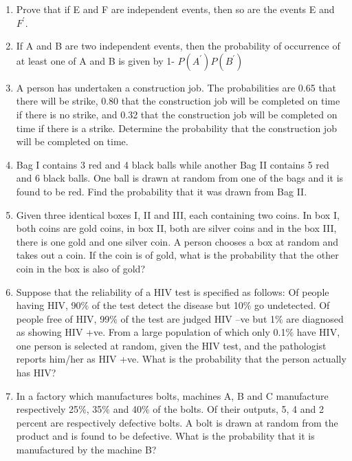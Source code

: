 \begin{enumerate}[label=\arabic*.,ref=\thesubsection.\theenumi]
\item Prove that if E and F are independent events, then so are the events E and $F^{'}$.\\

\item If A and B are two independent events, then the probability of occurrence of at least one of A and B is given by 1- $P(A^{'}) P(B^{'})$\\

\item A person has undertaken a construction job. The probabilities are 0.65 that there will be strike, 0.80 that the construction job will be completed on time if there is no strike, and 0.32 that the construction job will be completed on time if there is a strike. Determine the probability that the construction job will be completed on time.\\

\item Bag I contains 3 red and 4 black balls while another Bag II contains 5 red and 6 black balls. One ball is drawn at random from one of the bags and it is found to be red. Find the probability that it was drawn from Bag II.\\

\item Given three identical boxes I, II and III, each containing two coins. In box I, both coins are gold coins, in box II, both are silver coins and in the box III, there is one gold and one silver coin. A person chooses a box at random and takes out a coin. If the coin is of gold, what is the probability that the other coin in the box is also of gold?\\

\item Suppose that the reliability of a HIV test is specified as follows: Of people having HIV, 90$\%$ of the test detect the disease but 10$\%$ go undetected. Of people free of HIV, 99$\%$ of the test are judged HIV –ve but 1$\%$ are diagnosed as showing HIV +ve. From a large population of which only 0.1$\%$ have HIV, one person is selected at random, given the HIV test, and the pathologist reports him/her as HIV +ve. What is the probability that the person actually has HIV?\\

\item In a factory which manufactures bolts, machines A, B and C manufacture respectively 25$\%$, 35$\%$ and 40$\%$ of the bolts. Of their outputs, 5, 4 and 2 percent are respectively defective bolts. A bolt is drawn at random from the product and is found to be defective. What is the probability that it is manufactured by the machine B?\\


\end{enumerate}
